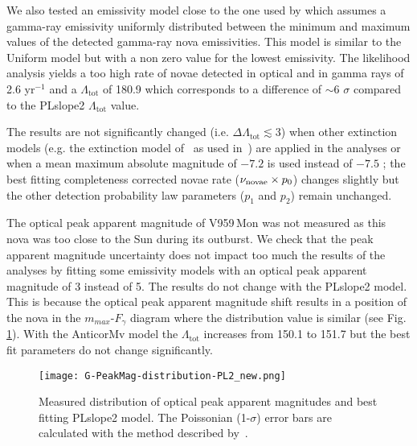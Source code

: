 \documentclass{aa} %
\newcommand{\tot}{\textrm{tot} }
\begin{document}
We also tested an emissivity model close to the one used by \citet{2017MNRAS.465.1218M} which assumes a gamma-ray emissivity uniformly distributed between the minimum and maximum values of the detected gamma-ray nova emissivities. This model is similar to the Uniform model but with a non zero value for the lowest emissivity. The likelihood analysis yields a too high rate of novae detected in optical and in gamma rays of 2.6 yr$^{-1}$ and a $\Lambda_{\tot}$ of 180.9 which corresponds to a difference of $\sim$6 $\sigma$ compared to the PLslope2 $\Lambda_{\tot}$ value. 

The results are not significantly changed (i.e. $\Delta\Lambda_{\tot} \lesssim 3$) when other extinction models (e.g. the extinction model of~\citet{1997AJ....114.2043H} as used in~\citet{2008A&A...485..223S}) are applied in the analyses or when a mean maximum absolute magnitude of $-7.2$ is used instead of $-7.5$ 
\citep[see the discussion in][]{2017ApJ...834..196S}; the best fitting completeness corrected novae rate ($\nu_{\rm novae} \times p_0$) changes slightly but the other detection probability law parameters ($p_1$ and $p_2$) remain unchanged.

The optical peak apparent magnitude of V959\,Mon was not measured as this nova was too close to the Sun during its outburst. We check that the peak apparent magnitude uncertainty does not impact too much the results of the analyses by fitting some emissivity models with an optical peak apparent magnitude of 3 instead of 5. The results do not change with the PLslope2 model. This is because the optical peak apparent magnitude shift results in a position of the nova in the $m_{max}$-$F_{\gamma}$ diagram where the distribution value is similar (see Fig. \ref{fig:mvdistrib}). With the AnticorMv model the $\Lambda_{\tot}$ increases from 150.1 to 151.7 but the best fit parameters do not change significantly.



\begin{figure}[htb!]
\begin{center}
\texttt{[image: G-PeakMag-distribution-PL2\_new.png]}
\noindent
\caption{\small Measured distribution of optical peak apparent magnitudes and best fitting PLslope2 model. The Poissonian (1-$\sigma$) error bars are calculated with the method described by~\citet{1986ApJ...303..336G}.}
\label{fig:mvdistrib}
\end{center}
\end{figure}
\end{document}
